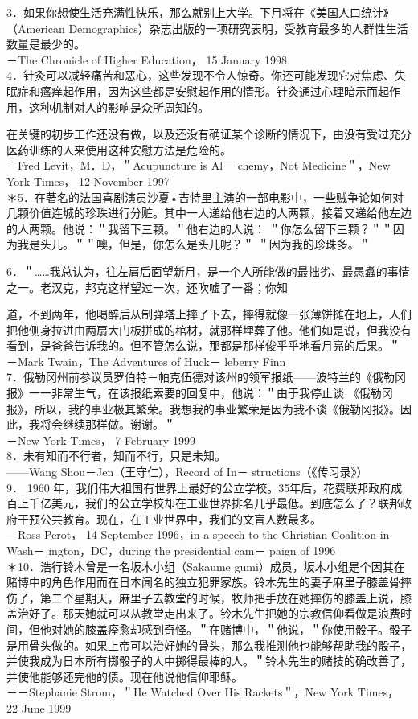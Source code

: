 3．如果你想使生活充满性快乐，那么就别上大学。下月将在《美国人口统计》（American Demographics）杂志出版的一项研究表明，受教育最多的人群性生活数量是最少的。\\
－The Chronicle of Higher Education， 15 January 1998\\
4．针灸可以减轻痛苦和恶心，这些发现不令人惊奇。你还可能发现它对焦虑、失眠症和瘙痒起作用，因为这些都是安慰起作用的情形。针灸通过心理暗示而起作用，这种机制对人的影响是众所周知的。

在关键的初步工作还没有做，以及还没有确证某个诊断的情况下，由没有受过充分医药训练的人来使用这种安慰方法是危险的。\\
－Fred Levit，M．D，＂Acupuncture is Al－ chemy，Not Medicine＂，New York Times， 12 November 1997\\
＊5．在著名的法国喜剧演员沙夏•吉特里主演的一部电影中，一些贼争论如何对几颗价值连城的珍珠进行分赃。其中一人递给他右边的人两颗，接着又递给他左边的人两颗。他说：＂我留下三颗。＂他右边的人说： ＂你怎么留下三颗？＂＂因为我是头儿。＂＂噢，但是，你怎么是头儿呢？＂ ＂因为我的珍珠多。＂

6．＂……我总认为，往左肩后面望新月，是一个人所能做的最拙劣、最愚䘄的事情之一。老汉克，邦克这样望过一次，还吹嘘了一番；你知

道，不到两年，他喝醉后从制弹塔上摔了下去，摔得就像一张薄饼摊在地上，人们把他侧身拉进由两扇大门板拼成的棺材，就那样埋葬了他。他们如是说，但我没有看到，是爸爸告诉我的。但不管怎么说，那都是那样俊乎乎地看月亮的后果。＂\\
－Mark Twain，The Adventures of Huck－ leberry Finn\\
7．俄勒冈州前参议员罗伯特－帕克伍德对该州的领军报纸——波特兰的《俄勒冈报》一一非常生气，在该报纸索要的回复中，他说：＂由于我停止谈 《俄勒冈报》，所以，我的事业极其繁荣。我想我的事业繁荣是因为我不谈《俄勒冈报》。因此，我将会继续那样做。谢谢。＂\\
－New York Times， 7 February 1999\\
8．未有知而不行者，知而不行，只是未知。\\
——Wang Shou－Jen（王守仁），Record of In－ structions（《传习录》）\\
9． 1960 年，我们伟大祖国有世界上最好的公立学校。35年后，花费联邦政府成百上千亿美元，我们的公立学校却在工业世界排名几乎最低。到底怎么了？联邦政府干预公共教育。现在，在工业世界中，我们的文盲人数最多。\\
—Ross Perot， 14 September 1996，in a speech to the Christian Coalition in Wash－ ington，DC，during the presidential cam－ paign of 1996\\
＊10．浩行铃木曾是一名坂木小组（Sakaume gumi）成员，坂木小组是个因其在赌博中的角色作用而在日本闻名的独立犯罪家族。铃木先生的妻子麻里子膝盖骨摔伤了，第二个星期天，麻里子去教堂的时候，牧师把手放在她摔伤的膝盖上说，膝盖治好了。那天她就可以从教堂走出来了。铃木先生把她的宗教信仰看做是浪费时间，但他对她的膝盖痊愈却感到奇怪。＂在赌博中，＂他说，＂你使用骰子。骰子是用骨头做的。如果上帝可以治好她的骨头，那么我推测他也能够帮助我的骰子，并使我成为日本所有掷骰子的人中掷得最棒的人。＂铃木先生的赌技的确改善了，并使他能够还完他的债。现在他说他信仰耶稣。\\
－－Stephanie Strom，＂He Watched Over His Rackets＂，New York Times， 22 June 1999

